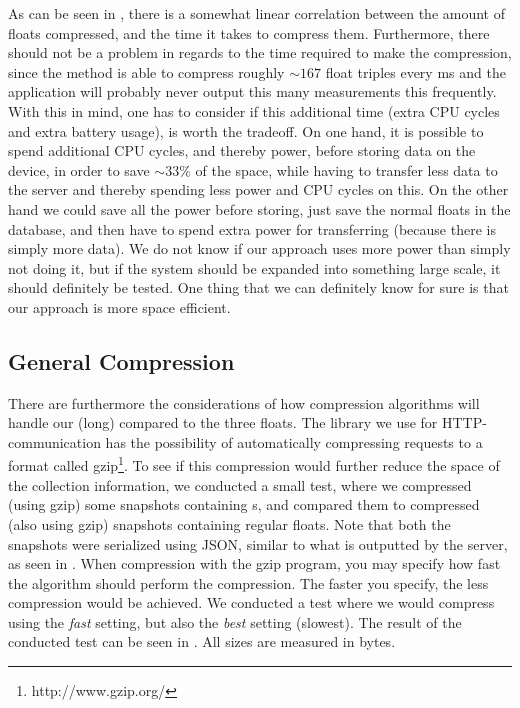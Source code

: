 As can be seen in , there is a somewhat linear correlation between the amount of floats compressed, and the time it takes to compress them. Furthermore, there should not be a problem in regards to the time required to make the compression, since the method is able to compress roughly $\sim 167$ float triples every ms and the application will probably never output this many measurements this frequently. With this in mind, one has to consider if this additional time (extra CPU cycles and extra battery usage), is worth the tradeoff. On one hand, it is possible to spend additional CPU cycles, and thereby power, before storing data on the device, in order to save $\sim 33\%$ of the space, while having to transfer less data to the server and thereby spending less power and CPU cycles on this. On the other hand we could save all the power before storing, just save the normal floats in the database, and then have to spend extra power for transferring (because there is simply more data). We do not know if our approach uses more power than simply not doing it, but if the system should be expanded into something large scale, it should definitely be tested. One thing that we can definitely know for sure is that our approach is more space efficient. 

\subsection{General Compression}
\label{sub:general_compression}

There are furthermore the considerations of how compression algorithms will handle our  (long) compared to the three floats. The library we use for HTTP-communication has the possibility of automatically compressing requests to a format called gzip\footnote{http://www.gzip.org/}. To see if this compression would further reduce the space of the collection information, we conducted a small test, where we compressed (using gzip) some snapshots containing s, and compared them to compressed (also using gzip) snapshots containing regular floats. Note that both the snapshots were serialized using JSON, similar to what is outputted by the server, as seen in . When compression with the gzip program, you may specify how fast the algorithm should perform the compression. The faster you specify, the less compression would be achieved. We conducted a test where we would compress using the \emph{fast} setting, but also the \emph{best} setting (slowest). The result of the conducted test can be seen in . All sizes are measured in bytes.

